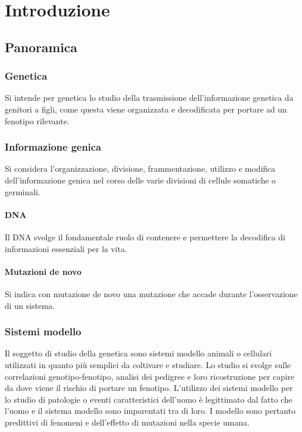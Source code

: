 \chapter{Introduzione}

\section{Panoramica}

	\subsection{Genetica}
	Si intende per genetica lo studio della trasmissione dell'informazione genetica da genitori a figli, come questa viene organizzata e decodificata per portare ad un fenotipo rilevante. 

	\subsection{Informazione genica}
	Si considera l'organizzazione, divisione, frammentazione, utilizzo e modifica dell'informazione genica nel corso delle varie divisioni di cellule somatiche o germinali. 

		\subsubsection{DNA}
		Il DNA svolge il fondamentale ruolo di contenere e permettere la decodifica di informazioni essenziali per la vita. 

		\subsubsection{Mutazioni de novo}
		Si indica con mutazione de novo una mutazione che accade durante l'osservazione di un sistema.

	\subsection{Sistemi modello}
	Il soggetto di studio della genetica sono sistemi modello animali o cellulari utilizzati in quanto pi\`u semplici da coltivare e studiare. 
	Lo studio si svolge sulle correlazioni genotipo-fenotipo, analisi dei pedigree e loro ricostruzione per capire da dove viene il rischio di portare un fenotipo. 
	L'utilizzo dei sistemi modello per lo studio di patologie o eventi caratteristici dell'uomo \`e legittimato dal fatto che l'uomo e il sistema modello sono imparentati tra di loro. 
	I modello sono pertanto predittivi di fenomeni e dell'effetto di mutazioni nella specie umana. 

